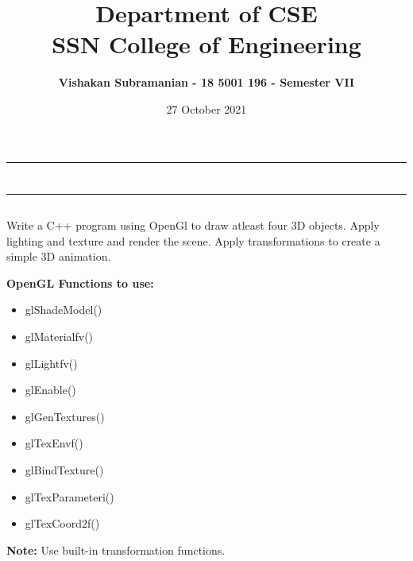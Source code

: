 \documentclass[12pt, a4]{article}
\title{\textbf{Department of CSE\\SSN College of Engineering}}
\author{\textbf{Vishakan Subramanian - 18 5001 196 - Semester VII}}
\date{27 October 2021}
\begin{document}
\maketitle
\hrule
\section*{}
\hrule
\bigskip

\subsection*{}
\subsection*{}
\begin{flushleft}

Write a C++ program using OpenGl to draw atleast four 3D objects. Apply lighting and texture and render the scene. Apply transformations to create a simple 3D animation. 
\bigskip

\textbf{OpenGL Functions to use:}

\begin{itemize}
	\item glShadeModel()
	\item glMaterialfv()
	\item glLightfv()
	\item glEnable()
	\item glGenTextures()
	\item glTexEnvf()
	\item glBindTexture()
	\item glTexParameteri()
	\item glTexCoord2f()
\end{itemize}

\bigskip
\textbf{Note:} Use built-in transformation functions.
 
\end{flushleft}

\newpage
\subsection*{}
\begin{flushleft}

\end{flushleft}
\end{document}
